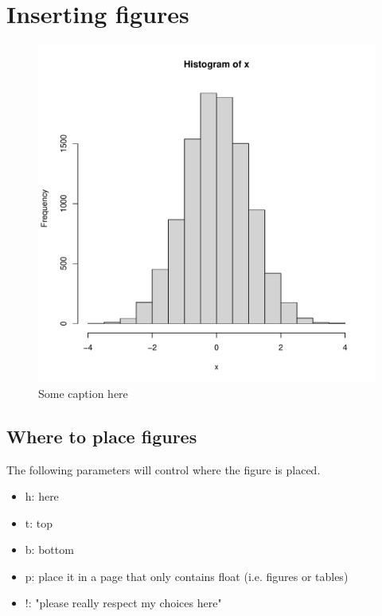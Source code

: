 \documentclass[11pt]{article}
\theoremstyle{quest}
\begin{document}
\newpage
\section{Inserting figures}


\begin{figure}[h!]  %
\centering %
\includegraphics[scale=0.3]{figs/normal.pdf} %
\caption{ %
  Some caption here
}
\label{fig:normal} %
\end{figure}

\subsection{Where to place figures}
The following parameters will control where the figure is placed.
\begin{itemize}
  \item h: here 
  \item t: top 
  \item b: bottom 
  \item p: place it in a page that only contains float (i.e. figures or tables)
  \item !: "please really respect my choices here" 
\end{itemize}
\end{document}
